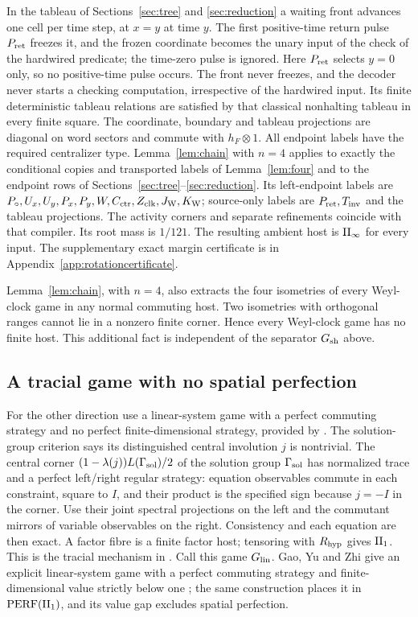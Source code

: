 In the tableau of Sections~\ref{sec:tree} and \ref{sec:reduction} a waiting front advances one cell per time step, at $x=y$ at time $y$. The first positive-time return pulse $P_{\rm ret}$ freezes it, and the frozen coordinate becomes the unary input of the check of the hardwired predicate; the time-zero pulse is ignored. Here $P_{\rm ret}$ selects $y=0$ only, so no positive-time pulse occurs. The front never freezes, and the decoder never starts a checking computation, irrespective of the hardwired input. Its finite deterministic tableau relations are satisfied by that classical nonhalting tableau in every finite square. The coordinate, boundary and tableau projections are diagonal on word sectors and commute with $h_F\otimes1$. All endpoint labels have the required centralizer type. Lemma~\ref{lem:chain} with $n=4$ applies to exactly the conditional copies and transported labels of Lemma~\ref{lem:four} and to the endpoint rows of Sections~\ref{sec:tree}--\ref{sec:reduction}. Its left-endpoint labels are $P_\circ,U_x,U_y,P_x,P_y,W,C_{\rm ctr},Z_{\rm clk},J_{\rm W},K_{\rm W}$; source-only labels are $P_{\rm ret},T_{\rm inv}$ and the tableau projections. The activity corners and separate refinements coincide with that compiler. Its root mass is $1/121$. The resulting ambient host is $\mathrm{II}_\infty$ for every input. The supplementary exact margin certificate is in Appendix~\ref{app:rotationcertificate}.

Lemma~\ref{lem:chain}, with $n=4$, also extracts the four isometries of every Weyl-clock game in any normal commuting host. Two isometries with orthogonal ranges cannot lie in a nonzero finite corner. Hence every Weyl-clock game has no finite host. This additional fact is independent of the separator $G_{\rm sh}$ above.

\subsection{A tracial game with no spatial perfection}
For the other direction use a linear-system game with a perfect commuting strategy and no perfect finite-dimensional strategy, provided by \cite{SlofstraNonclosed}. The solution-group criterion \cite[Theorems 4--5]{CLS} says its distinguished central involution $j$ is nontrivial. The central corner $(1-\lambda(j))L(\Gamma_{\rm sol})/2$ of the solution group $\Gamma_{\rm sol}$ has normalized trace and a perfect left/right regular strategy: equation observables commute in each constraint, square to $I$, and their product is the specified sign because $j=-I$ in the corner. Use their joint spectral projections on the left and the commutant mirrors of variable observables on the right. Consistency and each equation are then exact. A factor fibre is a finite factor host; tensoring with $R_{\rm hyp}$ gives $\mathrm{II}_1$. This is the tracial mechanism in \cite[Proposition 7.4]{ReadType}. Call this game $G_{\rm lin}$. Gao, Yu and Zhi give an explicit linear-system game with a perfect commuting strategy and finite-dimensional value strictly below one \cite{GYZ}; the same construction places it in $\mathrm{PERF}(\mathrm{II}_1)$, and its value gap excludes spatial perfection.

